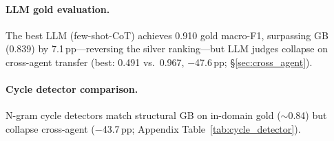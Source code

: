 \paragraph{LLM gold evaluation.}
The best LLM (few-shot-CoT) achieves 0.910 gold macro-F1, surpassing GB (0.839) by 7.1\,pp---reversing the silver ranking---but LLM judges collapse on cross-agent transfer (best: 0.491 vs.\ 0.967, $-$47.6\,pp; \S\ref{sec:cross_agent}).

\paragraph{Cycle detector comparison.}
N-gram cycle detectors match structural GB on in-domain gold (${\sim}$0.84) but collapse cross-agent ($-$43.7\,pp; Appendix Table~\ref{tab:cycle_detector}).